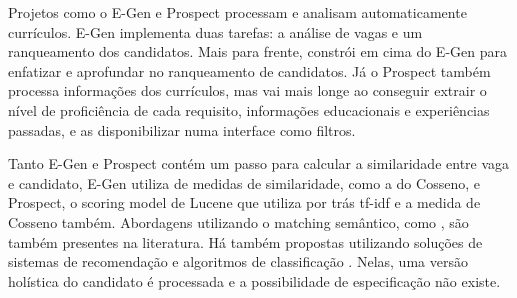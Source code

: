\documentclass[preprint,12pt]{elsarticle}
\begin{document}



Projetos como o E-Gen \cite{e-gen-job-processing-2007} e Prospect \cite{Singh2010PROSPECTAS} processam e analisam automaticamente currículos. E-Gen implementa duas tarefas: a análise de vagas e um ranqueamento dos candidatos. Mais para frente, \cite{improve-ranking-candidates-2009} constrói em cima do E-Gen \cite{e-gen-job-processing-2007} para enfatizar e aprofundar no ranqueamento de candidatos. Já o Prospect também processa informações dos currículos, mas vai mais longe ao conseguir extrair o nível de proficiência de cada requisito, informações educacionais e experiências passadas, e as disponibilizar numa interface como filtros.

Tanto E-Gen e Prospect contém um passo para calcular a similaridade entre vaga e candidato, E-Gen utiliza de medidas de similaridade, como a do Cosseno, e Prospect, o scoring model de Lucene que utiliza por trás tf-idf e a medida de Cosseno também. Abordagens utilizando o matching semântico, como \cite{impact-semantic-web-2005}, são também presentes na literatura. Há também propostas utilizando soluções de sistemas de recomendação \cite{needle-haystack-recommender-systems} e algoritmos de classificação \cite{poch-etal-2014-ranking}. Nelas, uma versão holística do candidato é processada e a possibilidade de especificação não existe.
\end{document}
